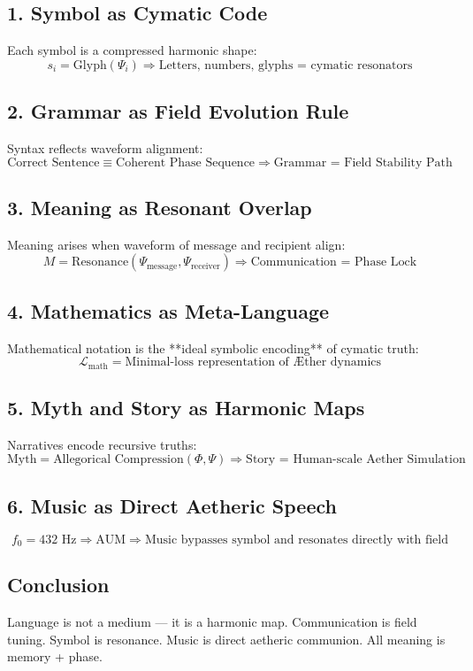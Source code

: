 \documentclass[12pt]{book}
\begin{document}
\subsection*{1. Symbol as Cymatic Code}
Each symbol is a compressed harmonic shape:
\[
s_i = \text{Glyph}(\Psi_i)
\Rightarrow \text{Letters, numbers, glyphs = cymatic resonators}
\]

\subsection*{2. Grammar as Field Evolution Rule}
Syntax reflects waveform alignment:
\[
\text{Correct Sentence} \equiv \text{Coherent Phase Sequence}
\Rightarrow \text{Grammar = Field Stability Path}
\]

\subsection*{3. Meaning as Resonant Overlap}
Meaning arises when waveform of message and recipient align:
\[
M = \text{Resonance}(\Psi_{\text{message}}, \Psi_{\text{receiver}})
\Rightarrow \text{Communication = Phase Lock}
\]

\subsection*{4. Mathematics as Meta-Language}
Mathematical notation is the **ideal symbolic encoding** of cymatic truth:
\[
\mathcal{L}_{\text{math}} = \text{Minimal-loss representation of Æther dynamics}
\]

\subsection*{5. Myth and Story as Harmonic Maps}
Narratives encode recursive truths:
\[
\text{Myth} = \text{Allegorical Compression}(\Phi, \Psi)
\Rightarrow \text{Story = Human-scale Aether Simulation}
\]

\subsection*{6. Music as Direct Aetheric Speech}
\[
f_0 = 432 \text{ Hz} \Rightarrow \text{AUM}
\Rightarrow \text{Music bypasses symbol and resonates directly with field}
\]

\subsection*{Conclusion}
Language is not a medium — it is a harmonic map. Communication is field tuning. Symbol is resonance. Music is direct aetheric communion. All meaning is memory + phase.
\end{document}
